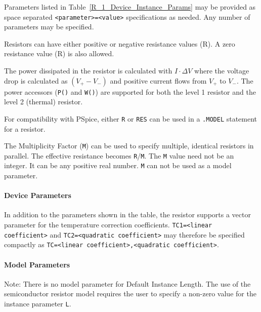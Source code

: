 \begin{Device}
\begin{Parameters}

Parameters listed in Table~\ref{R_1_Device_Instance_Params} may be provided as
space separated \texttt{<parameter>=<value>} specifications as needed.
Any number of parameters may be specified.

\end{Parameters}

\comments

Resistors can have either positive or negative resistance values (R).  A zero 
resistance value (R) is also allowed. 

The power dissipated in the resistor is calculated 
with $I \cdot \Delta V$ where the voltage drop is calculated as $(V_+ - V_-)$ 
and positive current flows from $V_+$ to $V_-$.  The power accessors
(\texttt{P()} and \texttt{W()}) are supported for both the level 1 resistor
and the level 2 (thermal) resistor.

For compatibility with PSpice, either \texttt{R} or \texttt{RES} can be used in a
\texttt{.MODEL} statement for a resistor.

The Multiplicity Factor (\texttt{M}) can be used to specify multiple, identical 
resistors in parallel. The effective resistance becomes \texttt{R}/\texttt{M}.  
The \texttt{M} value need not be an integer.  It can be any positive real number.  
\texttt{M} can not be used as a model parameter. 

\end{Device}

\newpage

\paragraph{Device Parameters}


In addition to the parameters shown in the table, the resistor supports a vector parameter for the temperature correction coefficients.  \texttt{TC1=<linear coefficient>} and \texttt{TC2=<quadratic coefficient>} may therefore be specified compactly as \texttt{TC=<linear coefficient>,<quadratic coefficient>}.

\paragraph{Model Parameters}


Note: There is no model parameter for Default Instance Length.  The use of the semiconductor resistor model requires
the user to specify a non-zero value for the instance parameter \texttt{L}. 

